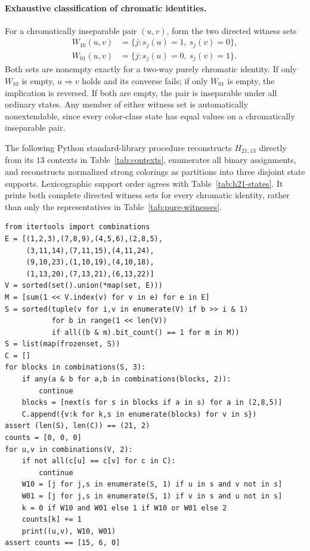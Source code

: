\documentclass[aps,pra,reprint,superscriptaddress,longbibliography,nofootinbib,floatfix,10pt]{revtex4-2}
\theoremstyle{definition}
\begin{document}
\paragraph*{Exhaustive classification of chromatic identities.}
For a chromatically inseparable pair $(u,v)$, form the two directed witness sets
\[
\begin{aligned}
W_{10}(u,v)&=\{j:s_j(u)=1,\ s_j(v)=0\},\\
W_{01}(u,v)&=\{j:s_j(u)=0,\ s_j(v)=1\}.
\end{aligned}
\]
Both sets are nonempty exactly for a two-way purely chromatic identity.
If only $W_{10}$ is empty, $u\Rightarrow v$ holds and its converse fails;
if only $W_{01}$ is empty, the implication is reversed. If both are empty,
the pair is inseparable under all ordinary states. Any member of either
witness set is automatically nonextendable, since every color-class state
has equal values on a chromatically inseparable pair.

The following Python standard-library procedure reconstructs $H_{21,13}$
directly from its $13$ contexts in Table~\ref{tab:contexts}, enumerates all
binary assignments, and reconstructs normalized strong colorings as partitions
into three disjoint state supports. Lexicographic support order agrees with
Table~\ref{tab:h21-states}. It prints both complete directed witness sets for
every chromatic identity, rather than only the representatives in
Table~\ref{tab:pure-witnesses}.
\begingroup\small
\begin{verbatim}
from itertools import combinations
E = [(1,2,3),(7,8,9),(4,5,6),(2,8,5),
     (3,11,14),(7,11,15),(4,11,24),
     (9,10,23),(1,10,19),(4,10,18),
     (1,13,20),(7,13,21),(6,13,22)]
V = sorted(set().union(*map(set, E)))
M = [sum(1 << V.index(v) for v in e) for e in E]
S = sorted(tuple(v for i,v in enumerate(V) if b >> i & 1)
           for b in range(1 << len(V))
           if all((b & m).bit_count() == 1 for m in M))
S = list(map(frozenset, S))
C = []
for blocks in combinations(S, 3):
    if any(a & b for a,b in combinations(blocks, 2)):
        continue
    blocks = [next(s for s in blocks if a in s) for a in (2,8,5)]
    C.append({v:k for k,s in enumerate(blocks) for v in s})
assert (len(S), len(C)) == (21, 2)
counts = [0, 0, 0]
for u,v in combinations(V, 2):
    if not all(c[u] == c[v] for c in C):
        continue
    W10 = [j for j,s in enumerate(S, 1) if u in s and v not in s]
    W01 = [j for j,s in enumerate(S, 1) if v in s and u not in s]
    k = 0 if W10 and W01 else 1 if W10 or W01 else 2
    counts[k] += 1
    print((u,v), W10, W01)
assert counts == [15, 6, 0]
\end{verbatim}
\endgroup
\end{document}
